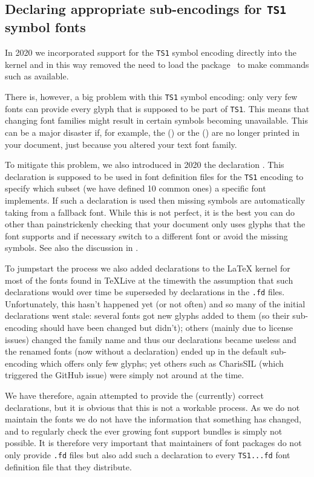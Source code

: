 \documentclass{ltnews}
\providecommand\Dash {\unskip \textemdash}
\begin{document}
\subsection{Declaring appropriate sub-encodings for \texttt{TS1} symbol fonts}

In 2020 we incorporated support for the \texttt{TS1} symbol encoding
directly into the kernel and in this way removed the need to load the
 package~\cite{39:ltnews31} to make commands such as
 available.

There is, however, a big problem with this \texttt{TS1} symbol
encoding: only very few fonts can provide every glyph that is supposed
to be part of \texttt{TS1}. This means that changing font families
might result in certain symbols becoming unavailable. This can be a
major disaster if, for example, the  (\texteuro) or the
 (\textohm) are no longer printed in your document, just
because you altered your text font family.

To mitigate this problem, we also introduced in 2020 the declaration
. This declaration is supposed to be used in
font definition files for the \texttt{TS1} encoding to specify which
subset (we have defined 10 common ones) a specific font implements. If
such a declaration is used then missing symbols are automatically
taking from a fallback font. While this is not perfect, it is the best
you can do other than painstrickenly checking that your document only
uses glyphs that the font supports and if necessary switch to a
different font or avoid the missing symbols. See also the discussion
in \cite{39:ltnews33}.

To jumpstart the process we also added declarations to the \LaTeX{}
kernel for most of the fonts found in \TeX{}Live at the time\Dash with
the assumption that such declarations would over time be superseded by
declarations in the \texttt{.fd} files. Unfortunately, this hasn't
happened yet (or not often) and so many of the initial declarations
went stale: several fonts got new glyphs added to them (so their
sub-encoding should have been changed but didn't); others (mainly due
to license issues) changed the family name and thus our declarations
became useless and the renamed fonts (now without a declaration) ended
up in the default sub-encoding which offers only few glyphs; yet
others such as CharisSIL (which triggered the GitHub issue) were
simply not around at the time.

We have therefore, again attempted to provide the (currently) correct
declarations, but it is obvious that this is not a workable
process. As we do not maintain the fonts we do not have the
information that something has changed, and to regularly check the
ever growing font support bundles is simply not possible. It is
therefore very important that maintainers of font packages do not only
provide \texttt{.fd} files but also add such a declaration to every
\texttt{TS1...fd} font definition file that they distribute.
\end{document}
